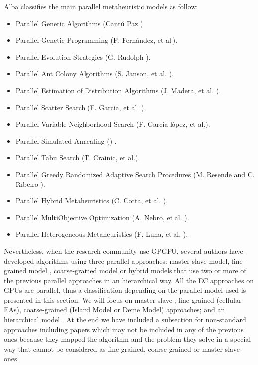 \documentclass[prodmode,acmtecs]{acmsmall}
\begin{document}
Alba classifies the main parallel metaheuristic models as follow:
\begin{itemize}
 \item Parallel Genetic Algorithms (Cant\'u Paz \cite{Cantu-Paz98asurvey}) %
\item Parallel Genetic Programming (F. Fernández, et al.\cite{springerlink:10.1023_A:1021873026259}).
\item Parallel Evolution Strategies (G. Rudolph \cite{Rudolph92parallelapproaches}).
\item Parallel Ant Colony Algorithms (S. Janson, et al. \cite{ParallelAntColony}).
\item Parallel Estimation of Distribution Algorithms (J. Madera, et al. \cite{springerlink:10.1007_3_540_32494_1_7}).
\item Parallel Scatter Search (F. Garcia, et al. \cite{GarciaLopez2003575}).
\item Parallel Variable Neighborhood Search (F. Garc\'ia-l\'opez, et al.\cite{Garcia_lopez_theparallel}).
\item Parallel Simulated Annealing (\cite{Genetic_parallelsimulated}) .
\item Parallel Tabu Search (T. Crainic, et al.\cite{Crainic97towardsa}).
\item Parallel Greedy Randomized Adaptive Search Procedures (M. Resende and C. Ribeiro \cite{Resendeparallelgreedy}).
\item Parallel Hybrid Metaheuristics (C. Cotta, et al. \cite{Cotta05e:parallel}). 
\item Parallel MultiObjective Optimization (A. Nebro, et al. \cite{Nebro07mocell:a}).
\item Parallel Heterogeneous Metaheuristics (F. Luna, et al. \cite{ANL04}). 
\end{itemize}

Nevertheless, when the research community use GPGPU, several authors have developed algorithms using three parallel approaches: master-slave model, fine-grained model \cite{jian_ming_li_efficient_2007}, coarse-grained model \cite{Maitre:2009:CGP:1569901_1570089} \cite{pospichalParallelGeneticAlgorithOnCUDA2010} or hybrid models  \cite{DBLP:conf/gecco/PospichalMOSJ11} that use two or more of the previous parallel approaches in an hierarchical way. All the EC approaches on GPUs are parallel, thus a classification depending on the parallel model used is presented in this section. We will focus on master-slave \cite{ZhangImplementationMasterSlave}, fine-grained (cellular EAs), coarse-grained (Island Model or Deme Model) approaches; and an hierarchical model \cite{DBLP:conf/gecco/PospichalMOSJ11}. 
At the end we have included a subsection for non-standard approaches including  papers which may not be included in any of the previous ones because they mapped the algorithm and the problem they solve in a special way that cannot be considered as fine grained, coarse grained or master-slave ones.
\end{document}
